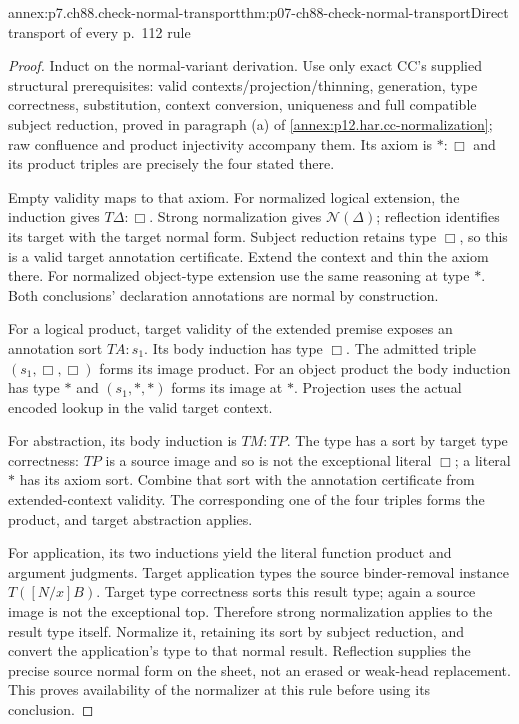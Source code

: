 \begin{annexitem}{annex:p7.ch88.check-normal-transport}{thm:p07-ch88-check-normal-transport}{Direct transport of every p.~112 rule}
\begin{proof}
Induct on the normal-variant derivation. Use only exact CC's supplied
structural prerequisites: valid contexts/projection/thinning,
generation, type correctness, substitution, context conversion,
uniqueness and full compatible subject reduction, proved in paragraph
(a) of \cref{annex:p12.har.cc-normalization}; raw confluence and
product injectivity accompany them. Its axiom is \(\ast:\Box\)
and its product triples are precisely the four stated there.

Empty validity maps to that axiom. For normalized logical extension,
the induction gives \(T\Delta:\Box\). Strong normalization gives
\(\mathcal N(\Delta)\); reflection identifies its target with the
target normal form. Subject reduction retains type \(\Box\), so
this is a valid target annotation certificate. Extend the context
and thin the axiom there. For normalized object-type extension use
the same reasoning at type \(\ast\). Both conclusions' declaration
annotations are normal by construction.

For a logical product, target validity of the extended premise exposes
an annotation sort \(TA:s_1\). Its body induction has type \(\Box\).
The admitted triple \((s_1,\Box,\Box)\) forms its image product.
For an object product the body induction has type \(\ast\) and
\((s_1,\ast,\ast)\) forms its image at \(\ast\). Projection
uses the actual encoded lookup in the valid target context.

For abstraction, its body induction is \(TM:TP\). The type has a
sort by target type correctness: \(TP\) is a source image and so
is not the exceptional literal \(\Box\); a literal \(\ast\)
has its axiom sort. Combine that sort with the annotation certificate
from extended-context validity. The corresponding one of the four
triples forms the product, and target abstraction applies.

For application, its two inductions yield the literal function product
and argument judgments. Target application types the source
binder-removal instance \(T([N/x]B)\). Target type correctness sorts
this result type; again a source image is not the exceptional top.
Therefore strong normalization applies to the result type itself.
Normalize it, retaining its sort by subject reduction, and convert
the application's type to that normal result. Reflection supplies
the precise source normal form on the sheet, not an erased or
weak-head replacement. This proves availability of the normalizer
at this rule before using its conclusion.


\end{proof}
\end{annexitem}
